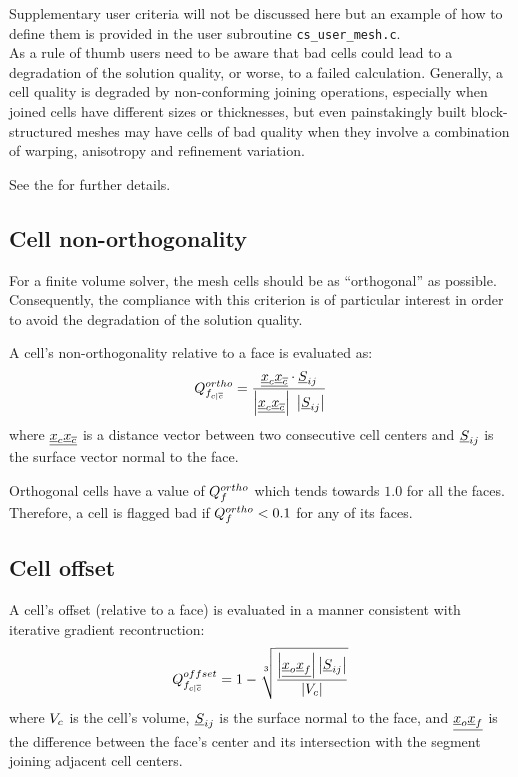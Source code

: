Supplementary user criteria will not be discussed here but an example of how to
define them is provided in the user subroutine \texttt{cs\_user\_mesh.c}.\\

As a rule of thumb users need to be aware that bad cells could lead to a
degradation of the solution quality, or worse, to a failed calculation.
Generally, a cell quality is degraded by non-conforming joining operations, especially
when joined cells have different sizes or thicknesses, but even painstakingly
built block-structured meshes may have cells of bad quality when they involve
a combination of warping, anisotropy and refinement variation.

See the 
for further details.

\subsection*{Cell non-orthogonality}

For a finite volume solver, the mesh cells should be as ``orthogonal'' as
possible. Consequently, the compliance with this criterion is of particular
interest in order to avoid the degradation of the solution quality.

A cell's non-orthogonality relative to a face is evaluated as:
\begin{equation}
Q^{ortho}_{{{f}_{c|{\overline{c}}}}} = \dfrac{\underline{{\underline{x}_{c}}\underline{x}_{{\overline{c}}}} \cdot \underline{S}_{{ij}}}{\left| \underline{{\underline{x}_{c}} \underline{x}_{{\overline{c}}}} \right| ~ \left| \underline{S}_{{ij}} \right|}
\end{equation}
where $\underline{{\underline{x}_{c}}\underline{x}_{{\overline{c}}}}$ is a distance vector between two consecutive cell centers and
$\underline{S}_{{ij}}$ is the surface vector normal to the face.

Orthogonal cells have a value of $Q^{ortho}_{{f}}$ which tends towards $1.0$ for all the faces.
Therefore, a cell is flagged bad if $Q^{ortho}_{{f}} < 0.1$ for any of its faces.

\subsection*{Cell offset}

A cell's offset (relative to a face) is evaluated in a manner consistent with
iterative gradient recontruction:
\begin{equation}
Q^{offset}_{{{f}_{c|{\overline{c}}}}} = 1 - \sqrt[3]{\dfrac{ \left| \underline{\underline{x}_o \underline{x}_{{f}}} \right| \left|  \underline{S}_{{ij}} \right|}{ \left| V_{c} \right| }}
\end{equation}
where $V_{c}$ is the cell's volume, $\underline{S}_{{ij}}$ is the surface normal to the face, and
$\underline{\underline{x}_o \underline{x}_{{f}}}$ is the difference between the face's center and its
intersection with the segment joining adjacent cell centers.

